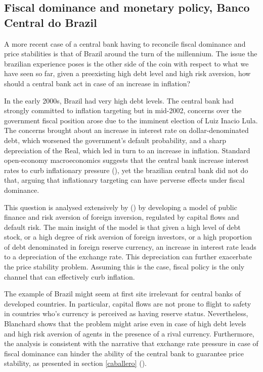 \documentclass[american]{scrartcl}
\newcommand{\citein}[1]{\citeauthor{#1} (\citeyear{#1})}
\begin{document}

\subsection{Fiscal dominance and monetary policy, Banco Central do Brazil}

A more recent case of a central bank having to reconcile fiscal dominance and price stabilities is that of Brazil around the turn of the millennium. The issue the brazilian experience poses is the other side of the coin with respect to what we have seen so far, given a preexisting high debt level and high risk aversion, how should a central bank act in case of an increase in inflation?

In the early 2000s, Brazil had very high debt levels. The central bank had strongly committed to inflation targeting but in mid-2002, concerns over the government fiscal position arose due to the imminent election of Luiz Inacio Lula. The concerns brought about an increase in interest rate on dollar-denominated debt, which worsened the government's default probability, and a sharp depreciation of the Real, which led in turn to an increase in inflation. Standard open-economy macroeconomics suggests that the central bank increase interest rates to curb inflationary pressure (\cite[p. 3]{Blanchard2004}), yet the brazilian central bank did not do that, arguing that inflationary targeting can have perverse effects under fiscal dominance.

This question is analysed extensively by \citein{Blanchard2004} by developing a model of public finance and risk aversion of foreign inversion, regulated by capital flows and default risk. The main insight of the model is that given a high level of debt stock, or a high degree of risk aversion of foreign investors, or a high proportion of debt denominated in foreign reserve currency, an increase in interest rate leads to a depreciation of the exchange rate. This depreciation can further exacerbate the price stability problem. Assuming this is the case, fiscal policy is the only channel that can effectively curb inflation.

The example of Brazil might seem at first site irrelevant for central banks of developed countries. In particular, capital flows are not prone to flight to safety in countries who's currency is perceived as having reserve status. Nevertheless, Blanchard shows that the problem might arise even in case of high debt levels and high risk aversion of agents in the presence of a rival currency. Furthermore, the analysis is consistent with the narrative that exchange rate pressure in case of fiscal dominance can hinder the ability of the central bank to guarantee price stability, as presented in section \ref{caballero} (\cite{Caballero2016}).
\end{document}
